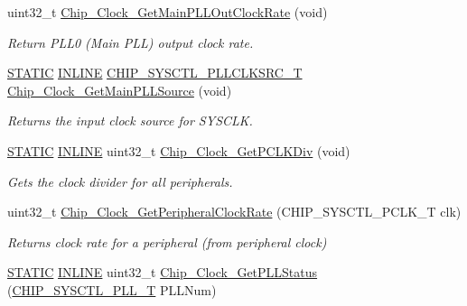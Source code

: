 \begin{DoxyCompactItemize}
uint32\+\_\+t \hyperlink{group__CLOCK__17XX__40XX_gad1a38c10a143b8e21d2a8085ec0cb13e}{Chip\+\_\+\+Clock\+\_\+\+Get\+Main\+P\+L\+L\+Out\+Clock\+Rate} (void)
\begin{DoxyCompactList}\small\item\em Return P\+L\+L0 (Main P\+LL) output clock rate. \end{DoxyCompactList}\item 
\hyperlink{group__LPC__Types__Public__Macros_ga10b2d890d871e1489bb02b7e70d9bdfb}{S\+T\+A\+T\+IC} \hyperlink{group__LPC__Types__Public__Types_ga2eb6f9e0395b47b8d5e3eeae4fe0c116}{I\+N\+L\+I\+NE} \hyperlink{group__CLOCK__17XX__40XX_gacda7fd6d13922330ce9344dbc4ec85b7}{C\+H\+I\+P\+\_\+\+S\+Y\+S\+C\+T\+L\+\_\+\+P\+L\+L\+C\+L\+K\+S\+R\+C\+\_\+T} \hyperlink{group__CLOCK__17XX__40XX_gaf678411ef6cde49c95c603030554fa9d}{Chip\+\_\+\+Clock\+\_\+\+Get\+Main\+P\+L\+L\+Source} (void)
\begin{DoxyCompactList}\small\item\em Returns the input clock source for S\+Y\+S\+C\+LK. \end{DoxyCompactList}\item 
\hyperlink{group__LPC__Types__Public__Macros_ga10b2d890d871e1489bb02b7e70d9bdfb}{S\+T\+A\+T\+IC} \hyperlink{group__LPC__Types__Public__Types_ga2eb6f9e0395b47b8d5e3eeae4fe0c116}{I\+N\+L\+I\+NE} uint32\+\_\+t \hyperlink{group__CLOCK__17XX__40XX_ga2fb0ad885ca820d555cf9ff4268cc252}{Chip\+\_\+\+Clock\+\_\+\+Get\+P\+C\+L\+K\+Div} (void)
\begin{DoxyCompactList}\small\item\em Gets the clock divider for all peripherals. \end{DoxyCompactList}\item 
uint32\+\_\+t \hyperlink{group__CLOCK__17XX__40XX_ga9c2bc86c857119426aa6a724c12a6f42}{Chip\+\_\+\+Clock\+\_\+\+Get\+Peripheral\+Clock\+Rate} (C\+H\+I\+P\+\_\+\+S\+Y\+S\+C\+T\+L\+\_\+\+P\+C\+L\+K\+\_\+T clk)
\begin{DoxyCompactList}\small\item\em Returns clock rate for a peripheral (from peripheral clock) \end{DoxyCompactList}\item 
\hyperlink{group__LPC__Types__Public__Macros_ga10b2d890d871e1489bb02b7e70d9bdfb}{S\+T\+A\+T\+IC} \hyperlink{group__LPC__Types__Public__Types_ga2eb6f9e0395b47b8d5e3eeae4fe0c116}{I\+N\+L\+I\+NE} uint32\+\_\+t \hyperlink{group__CLOCK__17XX__40XX_ga30a134e114a19fdf625326f8258e4652}{Chip\+\_\+\+Clock\+\_\+\+Get\+P\+L\+L\+Status} (\hyperlink{group__SYSCTL__17XX__40XX_ga5f5478a201b021ed04a0724bff524c4b}{C\+H\+I\+P\+\_\+\+S\+Y\+S\+C\+T\+L\+\_\+\+P\+L\+L\+\_\+T} P\+L\+L\+Num)

\end{DoxyCompactItemize}
